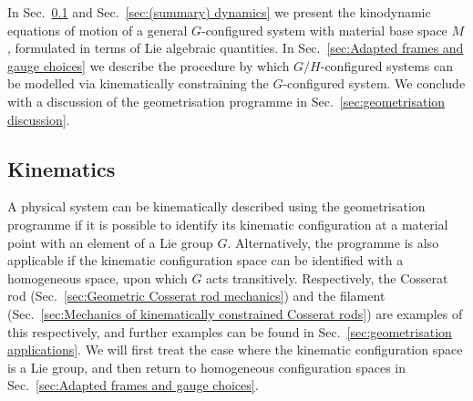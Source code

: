 In Sec.~\ref{sec:(summary) kinematics} and Sec.~\ref{sec:(summary) dynamics} we present the kinodynamic equations of motion of a general $G$-configured system with material base space $M$, formulated in terms of Lie algebraic quantities. In Sec.~\ref{sec:Adapted frames and gauge choices} we describe the procedure by which $G/H$-configured systems can be modelled via kinematically constraining the $G$-configured system. We conclude with a discussion of the geometrisation programme in Sec.~\ref{sec:geometrisation discussion}.



\subsection{Kinematics} \label{sec:(summary) kinematics}

A physical system can be kinematically described using the geometrisation programme if it is possible to identify its kinematic configuration at a material point with an element of a Lie group $G$. Alternatively, the programme is also applicable if the kinematic configuration space can be identified with a homogeneous space, upon which $G$ acts transitively. Respectively, the Cosserat rod (Sec.~\ref{sec:Geometric Cosserat rod mechanics}) and the filament (Sec.~\ref{sec:Mechanics of kinematically constrained Cosserat rods}) are examples of this respectively, and further examples can be found in Sec.~\ref{sec:geometrisation applications}. We will first treat the case where the kinematic configuration space is a Lie group, and then return to homogeneous configuration spaces in Sec.~\ref{sec:Adapted frames and gauge choices}.

